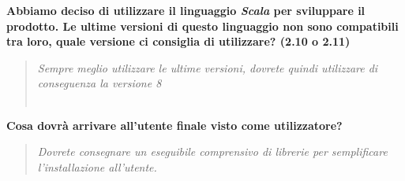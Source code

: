 \documentclass{scalatekids-article}
\begin{document}
\textbf{Abbiamo deciso di utilizzare il linguaggio \textit{Scala} per sviluppare il prodotto. Le ultime versioni di questo linguaggio non sono compatibili tra loro, quale versione ci consiglia di utilizzare? (2.10 o 2.11)}
\begin{quote}
  \textit{Sempre meglio utilizzare le ultime versioni, dovrete quindi utilizzare di conseguenza la  versione 8\\ \\}
\end{quote}
\textbf{Cosa dovrà arrivare all'utente finale visto come utilizzatore?}
\begin{quote}
  \textit{Dovrete consegnare un eseguibile comprensivo di librerie  per semplificare l'installazione all'utente.}
\end{quote}
\end{document}
